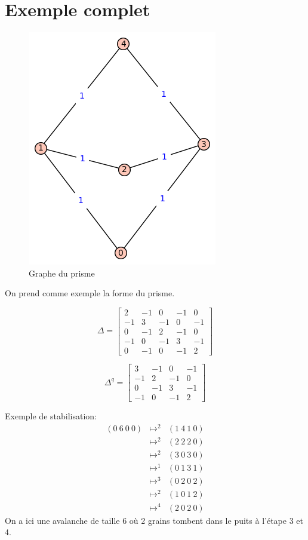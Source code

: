 \documentclass{report}
\begin{document}
\section{Exemple complet}

\begin{figure}[h]
\centering\includegraphics[scale=0.8]{prisme.png}
\caption{Graphe du prisme}
\label{prisme}
\end{figure}

On prend comme exemple la forme du prisme.

$$\Delta =  \left[\begin{array}{rrrrr}
2 & -1 & 0 & -1 & 0 \\
-1 & 3 & -1 & 0 & -1 \\
0 & -1 & 2 & -1 & 0 \\
-1 & 0 & -1 & 3 & -1 \\
0 & -1 & 0 & -1 & 2
\end{array}\right]
$$


$$\Delta^q = \left[\begin{array}{rrrr}
3 & -1 & 0 & -1 \\
-1 & 2 & -1 & 0 \\
0 & -1 & 3 & -1 \\
-1 & 0 & -1 & 2
\end{array}\right]
$$

Exemple de stabilisation:
\begin{eqnarray}
(0\ 6\ 0\ 0) & \mapsto^2 & (1\ 4\ 1\ 0)\\
& \mapsto^2 & (2\ 2\ 2\ 0)\\
& \mapsto^2 & (3\ 0\ 3\ 0)\\
& \mapsto^1 & (0\ 1\ 3\ 1)\\
& \mapsto^3 & (0\ 2\ 0\ 2)\\
& \mapsto^2 & (1\ 0\ 1\ 2)\\
& \mapsto^4 & (2\ 0\ 2\ 0)
\end{eqnarray}
On a ici une avalanche de taille 6 où 2 grains tombent dans le puits à l'étape 3 et 4.
\end{document}
